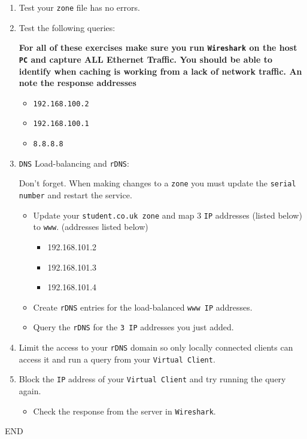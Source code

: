 \documentclass[11pt]{article}
\begin{document}
\begin{enumerate}
\begin{itemize}
        \end{itemize}
    \item Test your \texttt{zone} file has no errors.
    \item Test the following queries:
        \begin{tcolorbox}[colback=blue!20]
            \noindent\textbf{For all of these exercises make sure you run \texttt{Wireshark} on the host \texttt{PC} and capture ALL Ethernet Traffic. You should be able to identify when caching is working from a lack of network traffic. An note the response addresses}
        \end{tcolorbox}
        \begin{itemize}
            \item \texttt{192.168.100.2}
            \item \texttt{192.168.100.1}
            \item \texttt{8.8.8.8}
        \end{itemize}
    \item \texttt{DNS} Load-balancing and \texttt{rDNS}:
    \begin{tcolorbox}[title={\textbf{NOTE:}}]
        \noindent Don't forget. When making changes to a \texttt{zone} you must update the \texttt{serial number} and restart the service.
    \end{tcolorbox}
    \begin{itemize}
            \item Update your \texttt{student.co.uk zone} and map 3 \texttt{IP} addresses (listed below) to \texttt{www}. (addresses listed below)
                \begin{itemize}
                    \item 192.168.101.2
                    \item 192.168.101.3
                    \item 192.168.101.4
                \end{itemize}
            \item Create \texttt{rDNS} entries for the load-balanced \texttt{www IP} addresses.
            \item Query the \texttt{rDNS} for the \texttt{3 IP} addresses you just added.
        \end{itemize}
    \item Limit the access to your \texttt{rDNS} domain so only locally connected clients can access it and run a query from your \texttt{Virtual Client}. 
    \item Block the \texttt{IP} address of your \texttt{Virtual Client} and try running the query again.
        \begin{itemize}
            \item Check the response from the server in \texttt{Wireshark}.
        \end{itemize}
\end{enumerate}    
END
\end{document}
